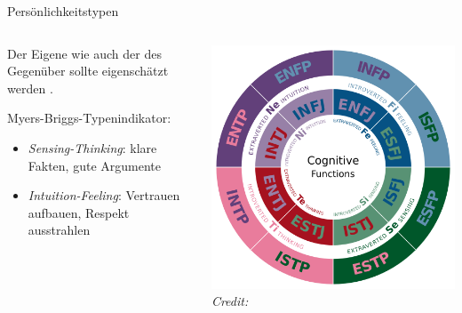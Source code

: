 \begin{frame}{Persönlichkeitstypen}
  \begin{columns}[c]
    \begin{column}{.55\textwidth}
     Der Eigene wie auch der des Gegenüber sollte eigenschätzt werden
        \cite[][ch. 4.5.5]{helmold_verhandlungskonzepte_2019}.

      Myers-Briggs-Typenindikator:
      \begin{itemize}
        \item \textit{Sensing-Thinking}: klare Fakten, gute Argumente
        \item \textit{Intuition-Feeling}: Vertrauen aufbauen, Respekt ausstrahlen
      \end{itemize}
    \end{column}
    \begin{column}{.35\textwidth}
      \includegraphics[width=\textwidth]{content/fig/mbti.png}
      {\hspace*{15pt}\hbox{\scriptsize\itshape Credit:}}
    \end{column}

\end{columns}


    
\end{frame}



